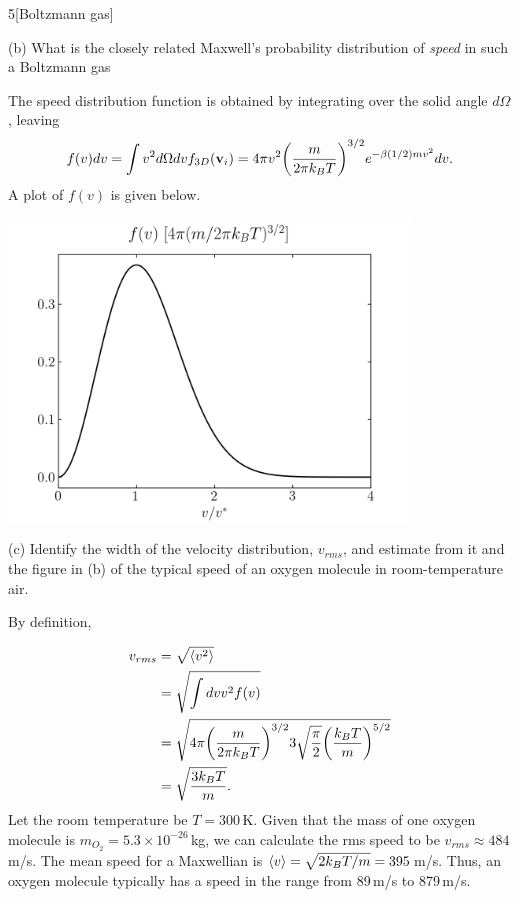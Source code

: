 \documentclass[12pt]{article}
\begin{document}
\begin{problem}{5}[Boltzmann gas]
\begin{solution}
\end{solution}


(b) What is the closely related Maxwell's probability distribution
of \textit{speed} in such a Boltzmann gas

\begin{solution}
 The speed
distribution function is obtained by integrating over the solid angle $d\Omega$,
leaving
\begin{equation}
    f(v)dv
    =\int v^2d\Omega dv f_{3D}(\vb{v}_i)
    =4\pi v^2\qty(\frac{m}{2\pi k_BT})^{3/2}e^{-\beta(1/2)mv^2}dv.
\end{equation}
A plot of $f(v)$ is given below.
\begin{center}
    \includegraphics[width=0.8\textwidth]{p5b.png} 
\end{center}
\end{solution}

(c) Identify the width of the velocity distribution, $v_{rms}$, and estimate
from it and the figure in (b) of the typical speed of an oxygen molecule in
room-temperature air.
\begin{solution}
By definition,

\begin{align}
    v_{rms}
    &=\sqrt{\expval{v^2}}\notag\\
    &=\sqrt{\int dv v^2f(v)}\notag\\
    &=\sqrt{4\pi\qty(\frac{m}{2\pi
    k_BT})^{3/2}3\sqrt{\frac\pi2}\qty(\frac{k_BT}{m})^{5/2}}\notag\\
    &=\sqrt{\frac{3k_BT}{m}}.
\end{align}
Let the room temperature be $T=300$\,\si{K}. Given that the mass of one oxygen 
molecule is $m_{O_2}=5.3\times10^{-26}$\,\unit{kg}, we can calculate the rms 
speed to be $v_{rms}\approx484$\,\si{m/s}. The mean speed for a Maxwellian is
$\expval{v}=\sqrt{2k_BT/m}=395$\,\si{m/s}. Thus, an oxygen molecule typically
has a speed in the range from 89\,\si{m/s} to 879\,\si{m/s}.
\end{solution}


\end{problem}
\end{document}
